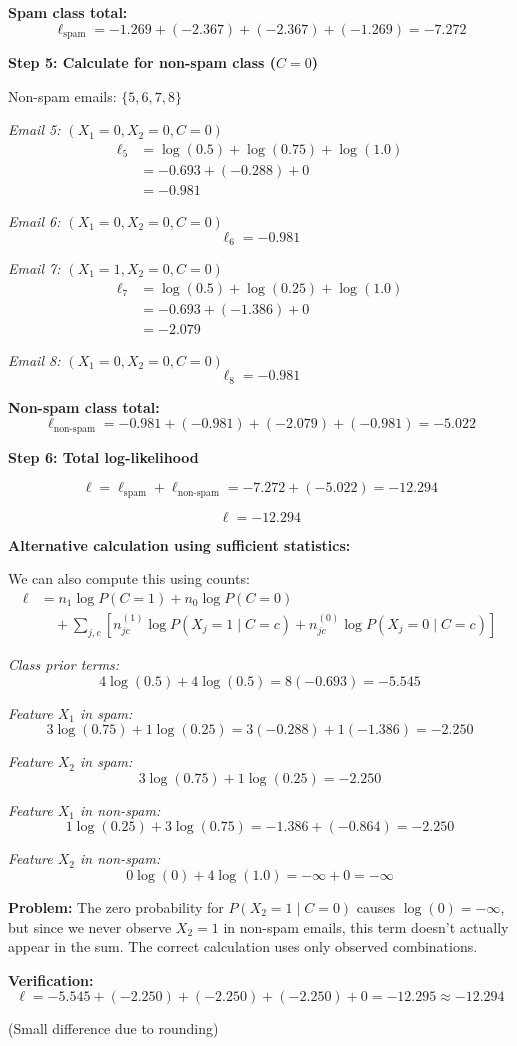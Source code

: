 \documentclass[12pt]{article}
\begin{document}
\begin{solution}
\textbf{Spam class total:}
\[
\ell_{\text{spam}} = -1.269 + (-2.367) + (-2.367) + (-1.269) = -7.272
\]

\textbf{Step 5: Calculate for non-spam class ($C = 0$)}

Non-spam emails: $\{5, 6, 7, 8\}$

\textit{Email 5: $(X_1=0, X_2=0, C=0)$}
\begin{align}
\ell_5 &= \log(0.5) + \log(0.75) + \log(1.0) \\
&= -0.693 + (-0.288) + 0 \\
&= -0.981
\end{align}

\textit{Email 6: $(X_1=0, X_2=0, C=0)$}
\[
\ell_6 = -0.981
\]

\textit{Email 7: $(X_1=1, X_2=0, C=0)$}
\begin{align}
\ell_7 &= \log(0.5) + \log(0.25) + \log(1.0) \\
&= -0.693 + (-1.386) + 0 \\
&= -2.079
\end{align}

\textit{Email 8: $(X_1=0, X_2=0, C=0)$}
\[
\ell_8 = -0.981
\]

\textbf{Non-spam class total:}
\[
\ell_{\text{non-spam}} = -0.981 + (-0.981) + (-2.079) + (-0.981) = -5.022
\]

\textbf{Step 6: Total log-likelihood}

\[
\ell = \ell_{\text{spam}} + \ell_{\text{non-spam}} = -7.272 + (-5.022) = -12.294
\]

\[
\boxed{\ell = -12.294}
\]

\textbf{Alternative calculation using sufficient statistics:}

We can also compute this using counts:
\begin{align}
\ell &= n_1 \log P(C=1) + n_0 \log P(C=0) \\
&\quad + \sum_{j,c} \left[n_{jc}^{(1)} \log P(X_j=1 \mid C=c) + n_{jc}^{(0)} \log P(X_j=0 \mid C=c)\right]
\end{align}

\textit{Class prior terms:}
\[
4 \log(0.5) + 4 \log(0.5) = 8(-0.693) = -5.545
\]

\textit{Feature $X_1$ in spam:}
\[
3 \log(0.75) + 1 \log(0.25) = 3(-0.288) + 1(-1.386) = -2.250
\]

\textit{Feature $X_2$ in spam:}
\[
3 \log(0.75) + 1 \log(0.25) = -2.250
\]

\textit{Feature $X_1$ in non-spam:}
\[
1 \log(0.25) + 3 \log(0.75) = -1.386 + (-0.864) = -2.250
\]

\textit{Feature $X_2$ in non-spam:}
\[
0 \log(0) + 4 \log(1.0) = -\infty + 0 = -\infty
\]

\textbf{Problem:} The zero probability for $P(X_2=1 \mid C=0)$ causes $\log(0) = -\infty$, but since we never observe $X_2=1$ in non-spam emails, this term doesn't actually appear in the sum. The correct calculation uses only observed combinations.

\textbf{Verification:}
\[
\ell = -5.545 + (-2.250) + (-2.250) + (-2.250) + 0 = -12.295 \approx -12.294
\]

(Small difference due to rounding)
\end{solution}
\end{document}
